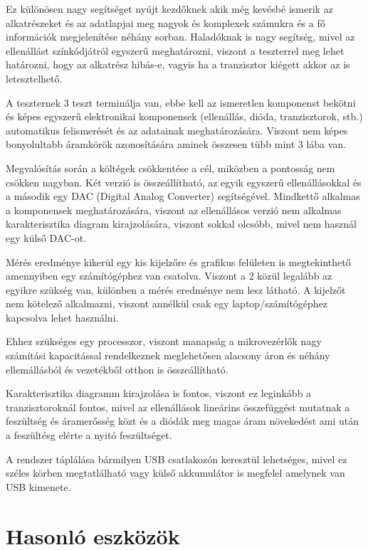 Ez különösen nagy segítséget nyújt kezdőknek akik még kevésbé ismerik az alkatrészeket és az 
adatlapjai meg nagyok és komplexek számukra és a fő információk megjelenítése néhány sorban. 
Haladóknak is nagy segítség, mivel az ellenállást színkódjátról egyszerű meghatározni, viszont 
a teszterrel meg lehet határozni, hogy az alkatrész hibás-e, vagyis ha a tranzisztor kiégett 
akkor az is letesztelhető.

A teszternek 3 teszt terminálja van, ebbe kell az ismeretlen komponenst bekötni és képes 
egyszerű elektronikai komponensek (ellenállás, dióda, tranzisztorok, stb.) automatikus 
felismerését és az adatainak meghatározására. Viszont nem képes bonyolultabb áramkörök 
azonosítására aminek összesen tübb mint 3 lába van.

Megvalósítás során a költégek csökkentése a cél, miközben a pontosság nem csökken nagyban. 
Két verzió is összeállítható, az egyik egyszerű ellenállásokkal és a második egy DAC (Digital 
Analog Converter) segítségével. Mindkettő alkalmas a komponensek meghatározására, viszont az 
ellenállásos verzió nem alkalmas karakterisztika diagram kirajzolására, viszont sokkal olcsóbb, 
mivel nem használ egy külső DAC-ot.

Mérés eredménye kikerül egy kis kijelzőre és grafikus felületen is megtekinthető amennyiben 
egy számítógéphez van csatolva. Viszont a 2 közül legalább az egyikre szükség van, különben a 
mérés eredménye nem lesz látható. A kijelzőt nem kötelező alkalmazni, viszont annélkül csak 
egy laptop/számítógéphez kapcsolva lehet használni.

Ehhez szükséges egy processzor, viszont manapság a mikrovezérlők nagy számítási kapacitással 
rendelkeznek meglehetősen alacsony áron és néhány ellemállásból és vezetékből otthon is 
összeállítható.

Karakterisztika diagramm kirajzolása is fontos, viszont ez leginkább a tranzisztoroknál 
fontos, mivel az ellenállások lineárins összefüggést mutatnak a feszültség és áramerősség közt 
és a diódák meg magas áram növekedést ami után a feszültésg elérte a nyitó feszültséget.

A rendszer táplálása bármilyen USB csatlakozón keresztül lehetséges, mivel ez széles körben 
megtatlálható vagy külső akkumulátor is megfelel amelynek van USB kimenete.

\section{Hasonló eszközök}

